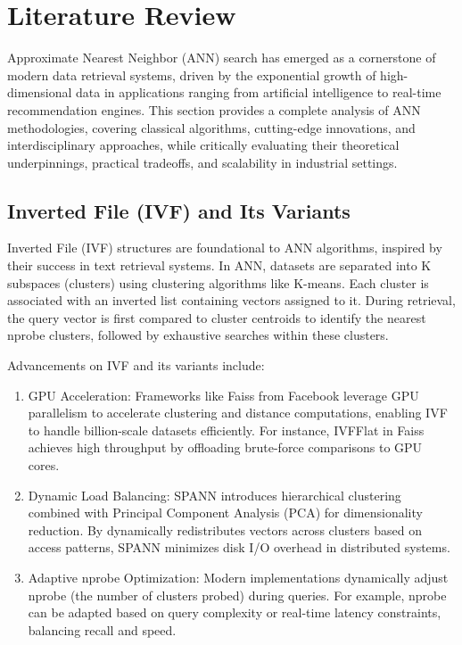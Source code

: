 \documentclass[sigconf, nonacm]{acmart}
\begin{document}
\section{Literature Review}

Approximate Nearest Neighbor (ANN) search has emerged as a cornerstone of modern data retrieval systems, driven by the exponential growth of high-dimensional data in applications ranging from artificial intelligence to real-time recommendation engines. This section provides a complete analysis of ANN methodologies, covering classical algorithms, cutting-edge innovations, and interdisciplinary approaches, while critically evaluating their theoretical underpinnings, practical tradeoffs, and scalability in industrial settings. 

\subsection{Inverted File (IVF) and Its Variants}
Inverted File (IVF) structures \cite{invertedindex} are foundational to ANN algorithms, inspired by their success in text retrieval systems. In ANN, datasets are separated into K subspaces (clusters) using clustering algorithms like K-means\cite{kmeans}. Each cluster is associated with an inverted list containing vectors assigned to it. During retrieval, the query vector is first compared to cluster centroids to identify the nearest nprobe clusters, followed by exhaustive searches within these clusters.

Advancements on IVF and its variants include: 
\begin{enumerate}
    \item GPU Acceleration: Frameworks like Faiss\cite{johnson2019billion} from Facebook leverage GPU parallelism to accelerate clustering and distance computations, enabling IVF to handle billion-scale datasets efficiently. For instance, IVFFlat in Faiss achieves high throughput by offloading brute-force comparisons to GPU cores.
    \item Dynamic Load Balancing: SPANN \cite{chen2021spann} introduces hierarchical clustering combined with Principal Component Analysis (PCA) \cite{pca} for dimensionality reduction. By dynamically redistributes vectors across clusters based on access patterns, SPANN minimizes disk I/O overhead in distributed systems. 
	\item Adaptive nprobe Optimization: Modern implementations dynamically adjust nprobe (the number of clusters probed) during queries. For example, nprobe can be adapted based on query complexity or real-time latency constraints, balancing recall and speed.
\end{enumerate}
\end{document}

